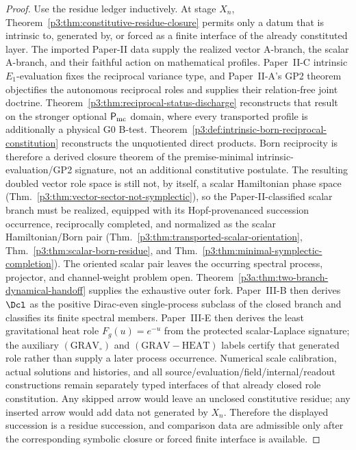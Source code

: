 \documentclass[11pt,a4paper]{article}
\begin{document}
\begin{proof}
Use the residue ledger inductively.  At stage \(X_n\),
Theorem~\ref{p3:thm:constitutive-residue-closure} permits only a datum that is
intrinsic to, generated by, or forced as a finite interface of the already
constituted layer.  The imported Paper-II data supply the realized vector
A-branch, the scalar A-branch, and their faithful action on mathematical
profiles.  Paper~II-C intrinsic \(E_1\)-evaluation fixes the reciprocal
variance type, and Paper~II-A's GP2 theorem objectifies the autonomous
reciprocal roles and supplies their relation-free joint doctrine.
Theorem~\ref{p3:thm:reciprocal-status-discharge} reconstructs that result on
the stronger optional \(\mathsf P_{\rm mc}\) domain, where every transported
profile is additionally a physical G0 B-test.
Theorem~\ref{p3:def:intrinsic-born-reciprocal-constitution} reconstructs the
unquotiented direct products.  Born reciprocity is therefore a derived closure
theorem of the premise-minimal intrinsic-evaluation/GP2 signature, not an
additional constitutive postulate.  The resulting doubled vector
role space is still not, by itself, a scalar Hamiltonian phase space
(Thm.~\ref{p3:thm:vector-sector-not-symplectic}), so the Paper-II-classified scalar branch must be realized, equipped with its Hopf-provenanced succession occurrence, reciprocally completed, and normalized as the scalar Hamiltonian/Born pair (Thm.~\ref{p3:thm:transported-scalar-orientation}, Thm.~\ref{p3:thm:scalar-born-residue}, and Thm.~\ref{p3:thm:minimal-symplectic-completion}).  The oriented scalar pair leaves the
occurring spectral process, projector, and channel-weight problem open.
Theorem~\ref{p3a:thm:two-branch-dynamical-handoff} supplies the exhaustive
outer fork.  Paper~III-B then derives \(\Dcl\) as the positive Dirac-even
single-process subclass of the closed branch and classifies its finite
spectral members.  Paper~III-E then derives the least gravitational heat role
\(F_g(u)=e^{-u}\) from the protected scalar-Laplace signature; the auxiliary
\((\mathrm{GRAV}_{\circ})\) and \((\mathrm{GRAV\!-
\!HEAT})\) labels certify that generated role rather than supply a later
process occurrence.  Numerical scale calibration, actual solutions and
histories, and all source/evaluation/field/internal/readout constructions
remain separately typed interfaces of that already closed role constitution.  Any skipped arrow would leave an
unclosed constitutive residue; any inserted arrow would add data not generated
by \(X_n\).  Therefore the displayed succession is a residue succession, and
comparison data are admissible only after the corresponding symbolic closure or
forced finite interface is available.
\end{proof}
\end{document}
